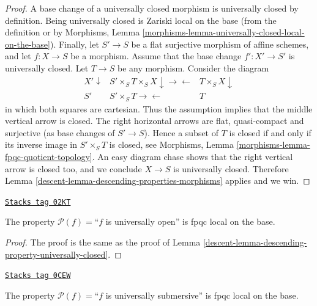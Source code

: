 \begin{proof}

A base change of a universally closed morphism is universally closed
by definition.
Being universally closed is Zariski local on the base (from the
definition or by
Morphisms, Lemma
\ref{morphisms-lemma-universally-closed-local-on-the-base}).
Finally, let
$S' \to S$ be a flat surjective morphism of affine schemes,
and let $f : X \to S$ be a morphism. Assume that the base change
$f' : X' \to S'$ is universally closed. Let $T \to S$ be any morphism.
Consider the diagram
$$
\begin{array}{ccc}X' \downarrow & S' \times_S T \times_S X \downarrow\longrightarrow\longleftarrow & T \times_S X \downarrow \\ S' & S' \times_S T \longrightarrow\longleftarrow & T\end{array}
$$
in which both squares are cartesian.
Thus the assumption implies that the middle vertical
arrow is closed. The right horizontal arrows are flat, quasi-compact
and surjective (as base changes of $S' \to S$).
Hence a subset of $T$ is closed if and only if its inverse
image in $S' \times_S T$ is closed, see Morphisms,
Lemma \ref{morphisms-lemma-fpqc-quotient-topology}.
An easy diagram chase shows that the right vertical
arrow is closed too, and we conclude $X \to S$ is
universally closed.
Therefore Lemma \ref{descent-lemma-descending-properties-morphisms} applies and we win.
\end{proof}

\begin{lemma}
\label{descent-lemma-descending-property-universally-open}
\href{https://stacks.math.columbia.edu/tag/02KT}{\texttt{Stacks tag 02KT}}

The property $\mathcal{P}(f) =$``$f$ is universally open''
is fpqc local on the base.
\end{lemma}

\begin{proof}

The proof is the same as the proof of
Lemma \ref{descent-lemma-descending-property-universally-closed}.
\end{proof}

\begin{lemma}
\label{descent-lemma-descending-property-universally-submersive}
\href{https://stacks.math.columbia.edu/tag/0CEW}{\texttt{Stacks tag 0CEW}}

The property $\mathcal{P}(f) =$``$f$ is universally submersive''
is fpqc local on the base.
\end{lemma}

